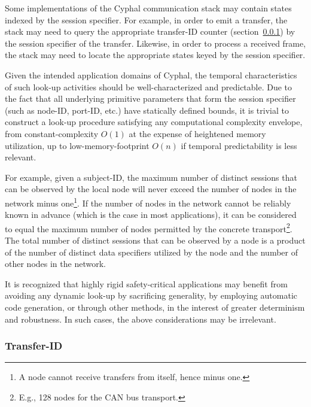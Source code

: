 \begin{remark}[breakable]
    Some implementations of the Cyphal communication stack may contain states indexed by the session specifier.
    For example, in order to emit a transfer, the stack may need to query the appropriate transfer-ID counter
    (section~\ref{sec:transport_transfer_id}) by the session specifier of the transfer.
    Likewise, in order to process a received frame,
    the stack may need to locate the appropriate states keyed by the session specifier.

    Given the intended application domains of Cyphal,
    the temporal characteristics of such look-up activities should be well-characterized and predictable.
    Due to the fact that all underlying primitive parameters that form the session specifier
    (such as node-ID, port-ID, etc.) have statically defined bounds,
    it is trivial to construct a look-up procedure satisfying any computational complexity envelope,
    from constant-complexity $O(1)$ at the expense of heightened memory utilization,
    up to low-memory-footprint $O(n)$ if temporal predictability is less relevant.

    For example, given a subject-ID, the maximum number of distinct sessions that can be observed
    by the local node will never exceed the number of nodes in the network minus one\footnote{%
        A node cannot receive transfers from itself, hence minus one.
    }.
    If the number of nodes in the network cannot be reliably known in advance (which is the case in most applications),
    it can be considered to equal the maximum number of nodes permitted by the concrete transport\footnote{%
        E.g., 128 nodes for the CAN bus transport.
    }.
    The total number of distinct sessions that can be observed by a node is a product of the number
    of distinct data specifiers utilized by the node and the number of other nodes in the network.

    It is recognized that highly rigid safety-critical applications may benefit from avoiding any
    dynamic look-up by sacrificing generality, by employing automatic code generation, or through other methods,
    in the interest of greater determinism and robustness.
    In such cases, the above considerations may be irrelevant.
\end{remark}

\subsubsection{Transfer-ID}\label{sec:transport_transfer_id}

